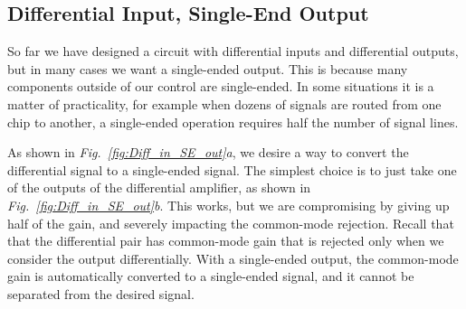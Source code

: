 \subsection{Differential Input, Single-End Output}
So far we have designed a circuit with differential inputs and differential outputs, but in many cases we want a single-ended output.  This is because many components outside of our control are single-ended.  In some situations it is a matter of practicality, for example when dozens of signals are routed from one chip to another, a single-ended operation requires half the number of signal lines.

As shown in \emph{Fig.~\ref{fig:Diff_in_SE_out}a}, we desire a way to convert the differential signal to a single-ended signal.  The simplest choice is to just take one of the outputs of the differential amplifier, as shown in \emph{Fig.~\ref{fig:Diff_in_SE_out}b}.   This works, but we are compromising by giving up half of the gain, and severely impacting the common-mode rejection.  Recall that that the differential pair has common-mode gain that is rejected only when we consider the output differentially.  With a single-ended output, the common-mode gain is automatically converted to a single-ended signal, and it cannot be separated from the desired signal.
